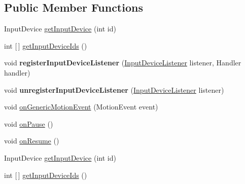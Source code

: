 \subsection*{Public Member Functions}
\begin{DoxyCompactItemize}
\item 
Input\+Device \hyperlink{classorg_1_1cocos2dx_1_1lib_1_1inputmanagercompat_1_1InputManagerV9_a86e8c5b196c4f0707dccc1d0f6b1d0dd}{get\+Input\+Device} (int id)
\item 
int \mbox{[}$\,$\mbox{]} \hyperlink{classorg_1_1cocos2dx_1_1lib_1_1inputmanagercompat_1_1InputManagerV9_a86d73356f6ea15f86459dcfbf70fa23e}{get\+Input\+Device\+Ids} ()
\item 
\mbox{\label{classorg_1_1cocos2dx_1_1lib_1_1inputmanagercompat_1_1InputManagerV9_a76a95859d7d38e1fd3b7dd545af932aa}} 
void {\bfseries register\+Input\+Device\+Listener} (\hyperlink{interfaceorg_1_1cocos2dx_1_1lib_1_1inputmanagercompat_1_1InputManagerCompat_1_1InputDeviceListener}{Input\+Device\+Listener} listener, Handler handler)
\item 
\mbox{\label{classorg_1_1cocos2dx_1_1lib_1_1inputmanagercompat_1_1InputManagerV9_ac6f6bbce11deb149571341b3909d6afa}} 
void {\bfseries unregister\+Input\+Device\+Listener} (\hyperlink{interfaceorg_1_1cocos2dx_1_1lib_1_1inputmanagercompat_1_1InputManagerCompat_1_1InputDeviceListener}{Input\+Device\+Listener} listener)
\item 
void \hyperlink{classorg_1_1cocos2dx_1_1lib_1_1inputmanagercompat_1_1InputManagerV9_aa7e7451896e351e520f511388907fde9}{on\+Generic\+Motion\+Event} (Motion\+Event event)
\item 
void \hyperlink{classorg_1_1cocos2dx_1_1lib_1_1inputmanagercompat_1_1InputManagerV9_ab80665476c8b79b16cbea8b2679effc6}{on\+Pause} ()
\item 
void \hyperlink{classorg_1_1cocos2dx_1_1lib_1_1inputmanagercompat_1_1InputManagerV9_a94c18cf8110be2479e6cb8d9528b57d5}{on\+Resume} ()
\item 
Input\+Device \hyperlink{classorg_1_1cocos2dx_1_1lib_1_1inputmanagercompat_1_1InputManagerV9_a86e8c5b196c4f0707dccc1d0f6b1d0dd}{get\+Input\+Device} (int id)
\item 
int \mbox{[}$\,$\mbox{]} \hyperlink{classorg_1_1cocos2dx_1_1lib_1_1inputmanagercompat_1_1InputManagerV9_a86d73356f6ea15f86459dcfbf70fa23e}{get\+Input\+Device\+Ids} ()

\end{DoxyCompactItemize}
